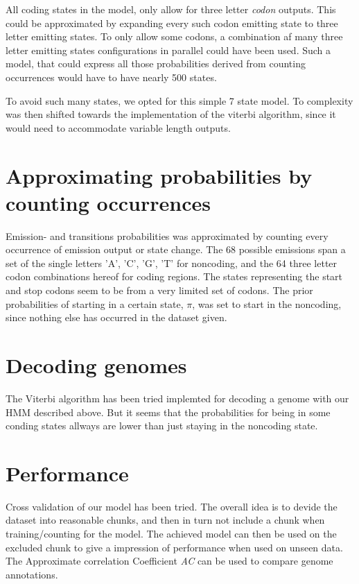\documentclass[a4paper,10pt,article,oneside,english]{memoir}
\begin{document}
All coding states in the model, only allow for three letter \emph{codon} outputs. This could be approximated by expanding every such codon emitting state to three letter emitting states. To only allow some codons, a combination af many three letter emitting states configurations in parallel could have been used. Such a model, that could express all those probabilities derived from counting occurrences would have to have nearly 500 states. 

To avoid such many states, we opted for this simple 7 state model. To complexity was then shifted towards the implementation of the viterbi algorithm, since it would need to accommodate variable length outputs. 


\section*{Approximating probabilities by counting occurrences}
Emission- and transitions probabilities was approximated by counting every occurrence of emission output or state change. The 68 possible emissions span a set of the single letters 'A', 'C', 'G', 'T' for noncoding, and the 64 three letter codon combinations hereof for coding regions. The states representing the start and stop codons seem to be from a very limited set of codons. The prior probabilities of starting in a certain state, $\pi$, was set to start in the noncoding, since nothing else has occurred in the dataset given. 


\section*{Decoding genomes}
The Viterbi algorithm has been tried implemted for decoding a genome with our HMM described above. But it seems that the probabilities for being in some conding states allways are lower than just staying in the noncoding state.


\section*{Performance}
Cross validation of our model has been tried. The overall idea is to devide the dataset into reasonable chunks, and then in turn not include a chunk when training/counting for the model. The achieved model can then be used on the excluded chunk to give a impression of performance when used on unseen data. The Approximate correlation Coefficient \emph{AC} can be used to compare genome annotations. 
\end{document}
